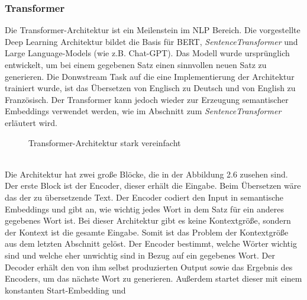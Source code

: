 \documentclass[12pt,letterpaper,ngerman]{article}
\begin{document}
\subsubsection{Transformer}
Die Transformer-Architektur \cite{transformer}
ist ein Meilenstein im NLP Bereich.
Die vorgestellte Deep Learning Architektur bildet die Basis
für BERT, \textit{SentenceTransformer} und Large Language-Models
(wie z.B. Chat-GPT).
Das Modell wurde ursprünglich entwickelt, um bei einem gegebenen
Satz 
einen sinnvollen neuen Satz zu generieren. Die Donwstream Task auf
die eine Implementierung der Architektur trainiert wurde,
ist das Übersetzen von Englisch zu Deutsch und von
English zu Französisch. 
Der Transformer kann jedoch wieder zur Erzeugung semantischer Embeddings 
verwendet werden, wie im Abschnitt zum \textit{SentenceTransformer} erläutert
wird.
\begin{figure}[H]
  \begin{center}
  \end{center}
  \caption{Transformer-Architektur stark vereinfacht}
\end{figure}
\hfill\\
Die Architektur hat zwei große Blöcke, die in der Abbildung 2.6
zusehen sind. Der erste Block ist der Encoder, dieser erhält die
Eingabe. Beim Übersetzen wäre das der zu übersetzende Text.
Der Encoder codiert den Input in semantische Embeddings und gibt
an, wie wichtig jedes Wort in dem Satz für ein anderes gegebenes
Wort ist.
Bei dieser Architektur gibt es keine Kontextgröße, sondern der
Kontext ist die gesamte Eingabe. Somit ist das Problem der 
Kontextgröße aus dem letzten Abschnitt gelöst.
Der Encoder bestimmt, welche Wörter wichtig sind und welche eher 
unwichtig sind in Bezug auf ein gegebenes Wort.
Der Decoder erhält den von ihm selbst produzierten Output sowie 
das Ergebnis des Encoders, um das nächste Wort zu generieren. 
Außerdem startet dieser mit einem konstanten Start-Embedding und 
\end{document}
